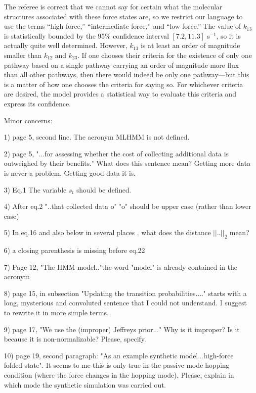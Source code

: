 \documentclass[ucb,qb3,10pt,fullfrom]{ucletter}
\begin{document}
\begin{letter}{}
The referee is correct that we cannot say for certain what the molecular structures associated with these force states are, so we restrict our language to use the terms ``high force,'' ``intermediate force,'' and ``low force.''
The value of $k_{13}$ is statistically bounded by the 95\% confidence interval $[7.2,11.3]$ s$^{-1}$, so it is actually quite well determined.
However, $k_{13}$ is at least an order of magnitude smaller than $k_{12}$ and $k_{23}$.
If one chooses their criteria for the existence of only one pathway based on a single pathway carrying an order of magnitude more flux than all other pathways, then there would indeed be only one pathway---but this is a matter of how one chooses the criteria for saying so.
For whichever criteria are desired, the model provides a statistical way to evaluate this criteria and express its confidence.

\color{red}
Minor concerns:

1) page 5, second line. The acronym MLHMM is not defined. 

2) page 5, "...for assessing whether the cost of collecting additional data is outweighed by their benefits." What does this sentence mean? Getting more data is never a problem. Getting good data it is.

3) Eq.1 The variable $s_t$ should be defined.

4) After eq.2 "..that collected data o" "o" should be upper case (rather than lower case)

5) In eq.16 and also below in several places , what does the distance $||..||_2$ mean? 

6) a closing parenthesis is missing before eq.22 

7) Page 12, "The HMM model.."the word "model" is already contained in the acronym 

8) page 15, in subsection "Updating the transition probabilities...." starts with a long, mysterious and convoluted sentence that I could not understand. I suggest to rewrite it in more simple terms.

9) page 17, "We use the (improper) Jeffreys prior..." Why is it improper? Is it because it is non-normalizable? Please, specify. 

10) page 19, second paragraph: "As an example synthetic model...high-force folded state". It seems to me this is only true in the passive mode hopping condition (where the force changes in the hopping mode). Please, explain in which mode the synthetic simulation was carried out.


\end{letter}
\end{document}
